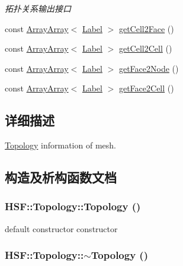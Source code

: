 \begin{DoxyCompactItemize}
\begin{DoxyCompactList}\small\item\em 拓扑关系输出接口 \item\end{DoxyCompactList}\item 
const \hyperlink{classHSF_1_1ArrayArray}{ArrayArray}$<$ \hyperlink{namespaceHSF_ae65d72be782e989396ebe5ec6ae4c2b6}{Label} $>$ \hyperlink{classHSF_1_1Topology_af95390ff895b1f2f0f419c944627a02f}{getCell2Face} ()
\item 
const \hyperlink{classHSF_1_1ArrayArray}{ArrayArray}$<$ \hyperlink{namespaceHSF_ae65d72be782e989396ebe5ec6ae4c2b6}{Label} $>$ \hyperlink{classHSF_1_1Topology_a5ae4e7f4f97d8946a3319a642d0b37b9}{getCell2Cell} ()
\item 
const \hyperlink{classHSF_1_1ArrayArray}{ArrayArray}$<$ \hyperlink{namespaceHSF_ae65d72be782e989396ebe5ec6ae4c2b6}{Label} $>$ \hyperlink{classHSF_1_1Topology_a6e6fd144f43943e4cffbfda646441942}{getFace2Node} ()
\item 
const \hyperlink{classHSF_1_1ArrayArray}{ArrayArray}$<$ \hyperlink{namespaceHSF_ae65d72be782e989396ebe5ec6ae4c2b6}{Label} $>$ \hyperlink{classHSF_1_1Topology_a6265b70c435a5e60b8389dedbe880228}{getFace2Cell} ()
\end{DoxyCompactItemize}


\subsection{详细描述}
\hyperlink{classHSF_1_1Topology}{Topology} information of mesh. 

\subsection{构造及析构函数文档}
\hypertarget{classHSF_1_1Topology_a0248d01b1c87c4d1450771da9f841dee}{
\subsubsection[{Topology}]{\setlength{\rightskip}{0pt plus 5cm}HSF::Topology::Topology ()}}
\label{classHSF_1_1Topology_a0248d01b1c87c4d1450771da9f841dee}


default constructor constructor \hypertarget{classHSF_1_1Topology_a16f4d3d8b4a870cbd26794a1c8d3cc5c}{
\subsubsection[{$\sim$Topology}]{\setlength{\rightskip}{0pt plus 5cm}HSF::Topology::$\sim$Topology ()}}
\label{classHSF_1_1Topology_a16f4d3d8b4a870cbd26794a1c8d3cc5c}


